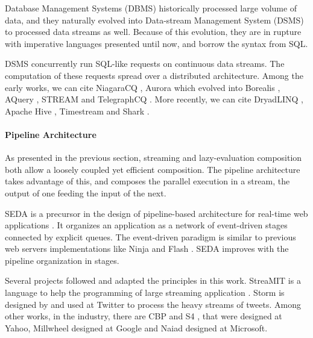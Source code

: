 Database Management Systems (DBMS) historically processed large volume of data, and they naturally evolved into Data-stream Management System (DSMS) to processed data streams as well.
Because of this evolution, they are in rupture with imperative languages presented until now, and borrow the syntax from SQL.

DSMS concurrently run SQL-like requests on continuous data streams.
The computation of these requests spread over a distributed architecture.
Among the early works, we can cite
NiagaraCQ \cite{Chen2000,Naughton2001},
Aurora \cite{Abadi2003,Abadi2003a,Balakrishnan2004} which evolved into
Borealis \cite{Abadi2005},
AQuery \cite{Lerner2003},
STREAM \cite{Arasu2003,Arasu2005} and
TelegraphCQ \cite{Krishnamurthy2003,Chandrasekaran2003}.
More recently, we can cite
DryadLINQ \cite{Isard2007,Yu2009},
Apache Hive \cite{Thusoo2009},
Timestream \cite{Qian2013} and
Shark \cite{Xin2013}.


\paragraph{Pipeline Architecture}

As presented in the previous section, streaming and lazy-evaluation composition both allow a loosely coupled yet efficient composition.
The pipeline architecture takes advantage of this, and composes the parallel execution in a stream, the output of one feeding the input of the next.

SEDA is a precursor in the design of pipeline-based architecture for real-time web applications \cite{Welsh2001}.
It organizes an application as a network of event-driven stages connected by explicit queues.
The event-driven paradigm is similar to previous web servers implementations like Ninja and Flash \cite{Gribble2001,Pai1999}.
SEDA improves with the pipeline organization in stages.

Several projects followed and adapted the principles in this work.
StreaMIT is a language to help the programming of large streaming application \cite{Thies2002}.
Storm \cite{Toshniwal2014} is designed by and used at Twitter to process the heavy streams of tweets.
Among other works, in the industry, there are
CBP \cite{Logothetis2010} and
S4 \cite{Neumeyer2010}, that were designed at Yahoo,
Millwheel \cite{Akidau2013} designed at Google and
Naiad \cite{Murray2013} designed at Microsoft.


